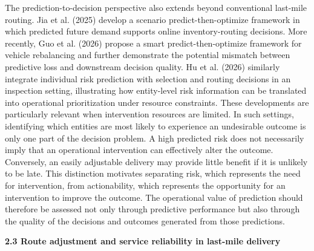 \documentclass[
]{article}
\begin{document}
The prediction-to-decision perspective also extends beyond conventional
last-mile routing. Jia et al. (2025) develop a scenario
predict-then-optimize framework in which predicted future demand
supports online inventory-routing decisions. More recently, Guo et al.
(2026) propose a smart predict-then-optimize framework for vehicle
rebalancing and further demonstrate the potential mismatch between
predictive loss and downstream decision quality. Hu et al. (2026)
similarly integrate individual risk prediction with selection and
routing decisions in an inspection setting, illustrating how
entity-level risk information can be translated into operational
prioritization under resource constraints. These developments are
particularly relevant when intervention resources are limited. In such
settings, identifying which entities are most likely to experience an
undesirable outcome is only one part of the decision problem. A high
predicted risk does not necessarily imply that an operational
intervention can effectively alter the outcome. Conversely, an easily
adjustable delivery may provide little benefit if it is unlikely to be
late. This distinction motivates separating risk, which represents the
need for intervention, from actionability, which represents the
opportunity for an intervention to improve the outcome. The operational
value of prediction should therefore be assessed not only through
predictive performance but also through the quality of the decisions and
outcomes generated from those predictions.

\textbf{2.3 Route adjustment and service reliability in last-mile
delivery}
\end{document}
